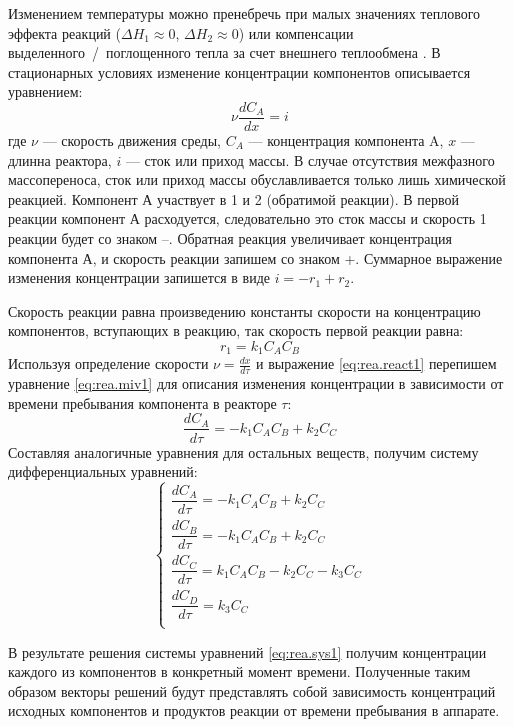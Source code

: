 Изменением температуры можно пренебречь при малых значениях теплового эффекта реакций ($\Delta H_1 \approx 0$, $\Delta H_2 \approx 0$) или компенсации выделенного~/~поглощенного тепла за счет внешнего теплообмена .
В стационарных условиях изменение концентрации компонентов описывается уравнением:
\begin{equation} \label{eq:rea.miv1}
\nu \dfrac{d C_A}{d x} = i
\end{equation}
где $\nu$ --- скорость движения среды, $C_A$ --- концентрация компонента A, $x$ --- длинна реактора, $i$ --- сток или приход массы. В случае отсутствия межфазного массопереноса, сток или приход массы обуславливается только лишь химической реакцией. Компонент А участвует в 1 и 2 (обратимой реакции). В первой реакции компонент А расходуется, следовательно это сток массы и скорость 1 реакции будет со знаком --. Обратная реакция увеличивает концентрация компонента А, и скорость реакции запишем со знаком +. Суммарное выражение изменения концентрации запишется в виде $i=-r_1+r_2$.

Скорость реакции равна произведению константы скорости на концентрацию компонентов, вступающих в реакцию, так скорость первой реакции равна: 
\begin{equation} \label{eq:rea.react1}
r_1=k_1 C_A C_B
\end{equation}
Используя определение скорости $\nu=\frac{d x}{d \tau}$ и выражение \eqref{eq:rea.react1}
перепишем уравнение \eqref{eq:rea.miv1} для описания изменения концентрации в зависимости от времени пребывания компонента в реакторе $\tau$:
\begin{equation}
\dfrac{d C_A}{d \tau} = -k_1 C_A C_B +k_2 C_C
\end{equation}
Составляя аналогичные уравнения для остальных веществ, получим систему дифференциальных уравнений:
\begin{equation}\label{eq:rea.sys1}
\left\lbrace 
\begin{gathered} 
\dfrac{d C_A} {d \tau} = -k_1 C_A C_B +k_2 C_C \\
\dfrac{d C_B} {d \tau} = -k_1 C_A C_B +k_2 C_C \\
\dfrac{d C_C} {d \tau} = k_1 C_A C_B -k_2 C_C - k_3 C_C \\
\dfrac{d C_D} {d \tau} = k_3 C_C \\
\end{gathered} 
\right.
\end{equation}

В результате решения системы уравнений \eqref{eq:rea.sys1} получим концентрации каждого из компонентов в конкретный момент времени. Полученные таким образом векторы решений будут представлять собой зависимость концентраций исходных компонентов и продуктов реакции от времени пребывания в аппарате.

